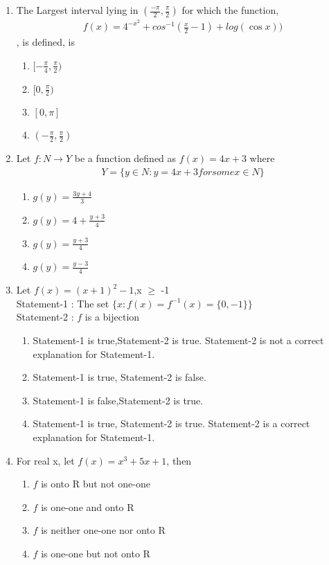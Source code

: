 \begin{enumerate}[label=\arabic*.,ref=\thesubsection.\theenumi]
\item The Largest interval lying in $(\frac{-\pi}{2},\frac{\pi}{2})$ for which the function, 
\begin{align*}
f(x)=4^{-x^2}+cos^{-1}(\frac{x}{2}-1)+log(\cos x))
\end{align*},
is defined, is
\begin{enumerate}
\item $[-\frac{\pi}{4},\frac{\pi}{2})$
\item $[0,\frac{\pi}{2})$
\item $[0,\pi]$
\item $(-\frac{\pi}{2},\frac{\pi}{2})$
\end{enumerate} 

\item Let $f: N \rightarrow Y$ be a function defined as $f(x)=4x+3$ where
\begin{align*}
Y=\{ y \in N:y=4x+3 for some x \in N\}
\end{align*}
\begin{enumerate}
\item $g(y)=\frac{3y+4}{3}$
\item $g(y)=4+\frac{y+3}{4}$
\item $g(y)=\frac{y+3}{4}$
\item $g(y)=\frac{y-3}{4}$
\end{enumerate}

\item Let $f(x)=(x+1)^2-1$,x $\geq$ -1\\
Statement-1 : The set $\lbrace x:f(x)=f^{-1}(x)=\lbrace0,-1\rbrace\rbrace$\\
Statement-2 : $f$ is a bijection
\begin{enumerate}
\item Statement-1 is true,Statement-2 is true. Statement-2 is not a correct explanation for Statement-1.
\item Statement-1 is true, Statement-2 is false.
\item Statement-1 is false,Statement-2 is true.
\item Statement-1 is true, Statement-2 is true. Statement-2 is a correct explanation for Statement-1.
\end{enumerate}

\item For real x, let $f(x)=x^{3}+5x+1$, then 
\begin{enumerate}
\item $f$ is onto R but not one-one
\item $f$ is one-one and onto R
\item $f$ is neither one-one nor onto R
\item $f$ is one-one but not onto R
\end{enumerate}


\end{enumerate}
